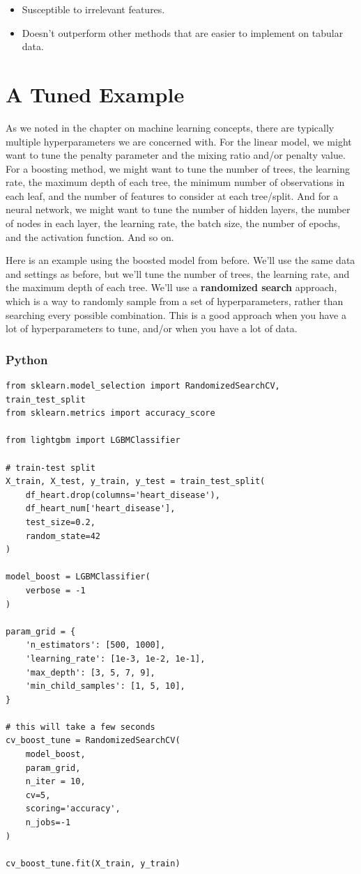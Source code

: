 \documentclass[
  letterpaper,
]{krantz}
\providecommand{\tightlist}{%
  \setlength{\itemsep}{0pt}\setlength{\parskip}{0pt}}\usepackage{longtable,booktabs,array}
\begin{document}
\begin{itemize}
\tightlist
\item
  Susceptible to irrelevant features.
\item
  Doesn't outperform other methods that are easier to implement on
  tabular data.
\end{itemize}

\section{A Tuned Example}\label{a-tuned-example}

As we noted in the chapter on machine learning concepts, there are
typically multiple hyperparameters we are concerned with. For the linear
model, we might want to tune the penalty parameter and the mixing ratio
and/or penalty value. For a boosting method, we might want to tune the
number of trees, the learning rate, the maximum depth of each tree, the
minimum number of observations in each leaf, and the number of features
to consider at each tree/split. And for a neural network, we might want
to tune the number of hidden layers, the number of nodes in each layer,
the learning rate, the batch size, the number of epochs, and the
activation function. And so on.

Here is an example using the boosted model from before. We'll use the
same data and settings as before, but we'll tune the number of trees,
the learning rate, and the maximum depth of each tree. We'll use a
\textbf{randomized search} approach, which is a way to randomly sample
from a set of hyperparameters, rather than searching every possible
combination. This is a good approach when you have a lot of
hyperparameters to tune, and/or when you have a lot of data.

\subsubsection{Python}

\begin{verbatim}
from sklearn.model_selection import RandomizedSearchCV, train_test_split
from sklearn.metrics import accuracy_score

from lightgbm import LGBMClassifier

# train-test split
X_train, X_test, y_train, y_test = train_test_split(
    df_heart.drop(columns='heart_disease'), 
    df_heart_num['heart_disease'],
    test_size=0.2,
    random_state=42
)

model_boost = LGBMClassifier(
    verbose = -1
)

param_grid = {
    'n_estimators': [500, 1000],
    'learning_rate': [1e-3, 1e-2, 1e-1],
    'max_depth': [3, 5, 7, 9],
    'min_child_samples': [1, 5, 10],
}

# this will take a few seconds
cv_boost_tune = RandomizedSearchCV(
    model_boost, 
    param_grid, 
    n_iter = 10,
    cv=5, 
    scoring='accuracy', 
    n_jobs=-1
)

cv_boost_tune.fit(X_train, y_train)
\end{verbatim}
\end{document}
